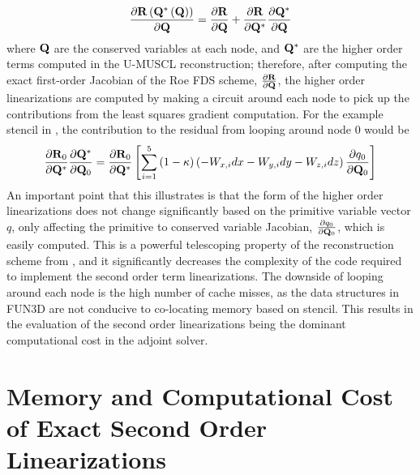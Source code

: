 \begin{equation}
  \frac{\partial \mathbf R\left(\mathbf Q^*\left( \mathbf Q \right) \right)}{\partial \mathbf Q} = 
  \frac{\partial \mathbf R}{\partial \mathbf Q} + \frac{\partial \mathbf R}{\partial \mathbf Q^{*}}\frac{\partial \mathbf Q^*}{\partial \mathbf Q}
  \label{residual-high-low}
\end{equation}
where $\mathbf Q$ are the conserved variables at each node, and $\mathbf Q^*$ are the higher
order terms computed in the U-MUSCL reconstruction; therefore, after computing
the exact first-order Jacobian of the Roe FDS scheme, $\frac{\partial \mathbf R}{\partial \mathbf Q}$, the
higher order linearizations are computed by making a circuit around each node to
pick up the contributions from the least squares gradient computation.  For the
example stencil in , the contribution to the residual
from looping around node 0 would be
\begin{equation}
  \frac{\partial \mathbf R_0}{\partial \mathbf Q^*}\frac{\partial \mathbf Q^*}{\partial \mathbf Q_0} = \frac{\partial \mathbf R_0}{\partial \mathbf Q^*} \left[\sum_{i=1}^5{(1-\kappa)
  \left( -W_{x,i}dx - W_{y,i}dy - W_{z,i}dz \right) \frac{\partial q_0}{\partial \mathbf Q_0}}\right]
  \label{ho-linearization}
\end{equation}
An important point that this illustrates is that the form of the higher order
linearizations does not change significantly based on the primitive variable
vector $q$, only affecting the primitive to conserved variable Jacobian,
$\frac{\partial q_0}{\partial \mathbf Q_0}$, which is easily computed.  This is a powerful telescoping
property of the reconstruction scheme from ,
and it significantly decreases the complexity of the code required to implement
the second order term linearizations.  The downside of looping around each node
is the high number of cache misses, as the data structures in FUN3D are not
conducive to co-locating memory based on stencil.  This results in the
evaluation of the second order linearizations being the dominant computational
cost in the adjoint solver.

\section{Memory and Computational Cost of Exact Second Order Linearizations}
\label{sec:2nd-order-mem-cost}

